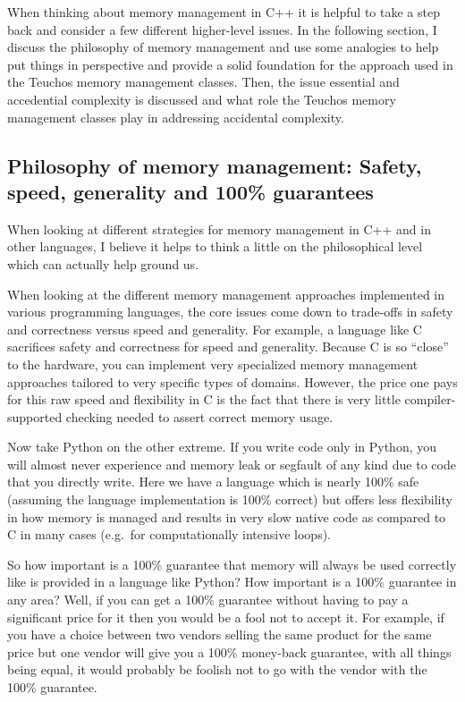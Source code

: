 \documentclass[pdf,ps2pdf,11pt]{SANDreport}
\begin{document}
When thinking about memory management in C++ it is helpful to take a
step back and consider a few different higher-level issues.  In the
following section, I discuss the philosophy of memory management and
use some analogies to help put things in perspective and provide a
solid foundation for the approach used in the Teuchos memory
management classes.  Then, the issue essential and accedential
complexity is discussed and what role the Teuchos memory management
classes play in addressing accidental complexity.


%
{}\subsection{Philosophy of memory management: Safety, speed,
generality and 100\% guarantees}
\label{sec:phylosophy-of-mem-mng}
%

When looking at different strategies for memory management in C++ and
in other languages, I believe it helps to think a little on the
philosophical level which can actually help ground us.

When looking at the different memory management approaches implemented
in various programming languages, the core issues come down to trade-offs
in safety and correctness versus speed and generality.  For example, a
language like C sacrifices safety and correctness for speed and
generality.  Because C is so ``close'' to the hardware, you can
implement very specialized memory management approaches tailored to
very specific types of domains.  However, the price one pays for this
raw speed and flexibility in C is the fact that there is very little
compiler-supported checking needed to assert correct memory usage.

Now take Python on the other extreme.  If you write code only in
Python, you will almost never experience and memory leak or segfault
of any kind due to code that you directly write.  Here we have a
language which is nearly 100\% safe (assuming the language
implementation is 100\% correct) but offers less flexibility in how
memory is managed and results in very slow native code as compared to
C in many cases (e.g.\ for computationally intensive loops).

So how important is a 100\% guarantee that memory will always be used
correctly like is provided in a language like Python?  How important
is a 100\% guarantee in any area?  Well, if you can get a 100\%
guarantee without having to pay a significant price for it then you
would be a fool not to accept it.  For example, if you have a choice
between two vendors selling the same product for the same price but
one vendor will give you a 100\% money-back guarantee, with all things
being equal, it would probably be foolish not to go with the vendor
with the 100\% guarantee.
\end{document}

